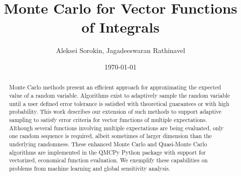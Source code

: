 \documentclass{article}[12pt]
\title{Monte Carlo for Vector Functions of Integrals}
\author{Aleksei Sorokin, Jagadeeswaran Rathinavel}
\date{\today}
\begin{document}
\maketitle

\begin{abstract}
Monte Carlo methods present an efficient approach for approximating the expected value of a random variable. Algorithms exist to adaptively sample the random variable until a user defined error tolerance is satisfied with theoretical guarantees or with high probability. This work describes our extension of such methods to support adaptive sampling to satisfy error criteria for vector functions of multiple expectations. Although several functions involving multiple expectations are being evaluated, only one random sequence is required, albeit sometimes of larger dimension than the underlying randomness. These enhanced Monte Carlo and Quasi-Monte Carlo algorithms are implemented in the QMCPy Python package with support for vectorized, economical function evaluation. We exemplify these capabilities on problems from machine learning and global sensitivity analysis.
\end{abstract}

\tableofcontents

\newpage 

\end{document}
